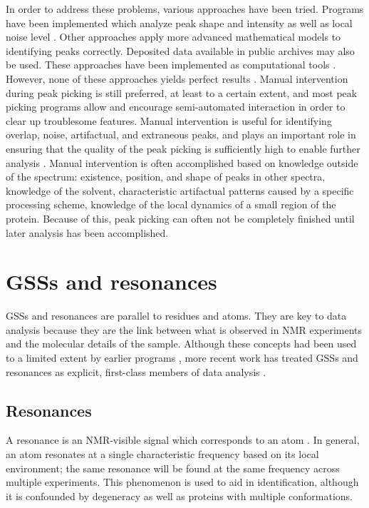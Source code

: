 In order to address these problems, various approaches have been tried.  
Programs have been implemented which analyze peak shape and intensity as 
well as local noise level \cite{munin, autopsy}.  Other approaches 
apply more advanced mathematical models to identifying peaks correctly.  
Deposited data available in public archives may also be used. 
These approaches have been implemented as computational tools 
\cite{williamson2009automated, guerry2011automated}.
However, none of these approaches yields perfect 
results \cite{guerry2011automated}.  Manual intervention during peak picking 
is still preferred, at least to a certain extent, and most peak picking 
programs allow and encourage semi-automated interaction in order to clear 
up troublesome features.  Manual intervention is useful for identifying 
overlap, noise, artifactual, and extraneous peaks, 
and plays an important role in ensuring that the quality of the peak picking 
is sufficiently high to enable further analysis \cite{guntert2009automated}.  
Manual intervention is often accomplished based on knowledge outside of the 
spectrum: existence, position, and shape of peaks in other spectra, knowledge 
of the solvent, characteristic artifactual patterns caused by a specific 
processing scheme, knowledge of the local dynamics of a small region of the 
protein.  \cite{williamson2009automated, guntert2009automated, 
altieri2004automation, baran2004automated}
Because of this, peak picking can often not be completely finished until 
later analysis has been accomplished.


\section{GSSs and resonances}

GSSs \cite{saga, ezassign, pistachio, autoassign1997, autoassign2001}
and resonances \cite{ccpn} are parallel to residues and atoms.
They are key to data analysis because they are the link between what is 
observed in NMR experiments and the molecular details of the sample.
Although these concepts had been used to a limited extent by earlier programs
\cite{xeasy, sparky}, more recent work has treated GSSs and resonances as 
explicit, first-class members of data analysis \cite{ccpn, bmrb}.

\subsection{Resonances}
A resonance is an NMR-visible signal which corresponds to an atom \cite{ccpn}.
In general, an atom resonates at a single characteristic frequency based
on its local environment;  the same resonance will be found at the same 
frequency across multiple experiments.  This phenomenon is used to aid in 
identification, although it is confounded by degeneracy as well as proteins
with multiple conformations.

